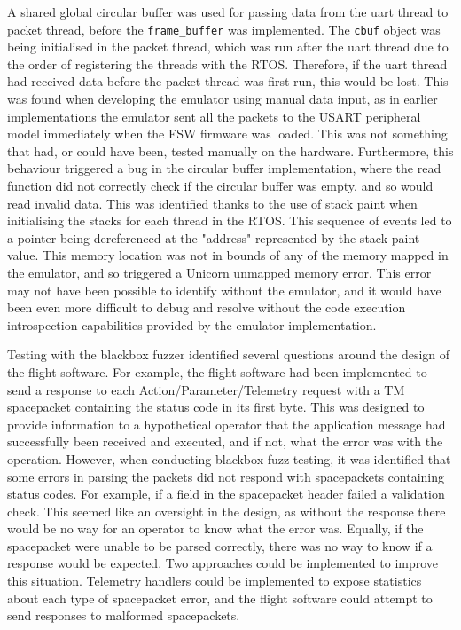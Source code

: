 \documentclass[../report.tex]{subfiles}
\begin{document}
A shared global circular buffer was used for passing data from the uart thread
to packet thread, before the \lstinline|frame_buffer| was implemented. The
\lstinline|cbuf| object was being initialised in the packet thread, which was
run after the uart thread due to the order of registering the threads with the
RTOS. Therefore, if the uart thread had received data before the packet thread
was first run, this would be lost. This was found when developing the emulator
using manual data input, as in earlier implementations the emulator sent all
the packets to the USART peripheral model immediately when the FSW firmware
was loaded. This was not something that had, or could have been, tested manually
on the hardware. Furthermore, this behaviour triggered a bug in the circular
buffer implementation, where the read function did not correctly check if the
circular buffer was empty, and so would read invalid data. This was identified
thanks to the use of stack paint when initialising the stacks for each thread
in the RTOS. This sequence of events led to a pointer being dereferenced at the
"address" represented by the stack paint value. This memory location was not in
bounds of any of the memory mapped in the emulator, and so triggered a Unicorn
unmapped memory error. This error may not have been possible to identify
without the emulator, and it would have been even more difficult to debug and
resolve without the code execution introspection capabilities provided by the
emulator implementation.

Testing with the blackbox fuzzer identified several questions around the design
of the flight software. For example, the flight software had been implemented
to send a response to each Action/Parameter/Telemetry request with a TM
spacepacket containing the status code in its first byte. This was designed to
provide information to a hypothetical operator that the application message had
successfully been received and executed, and if not, what the error was with
the operation. However, when conducting blackbox fuzz testing, it was
identified that some errors in parsing the packets did not respond with
spacepackets containing status codes. For example, if a field in the
spacepacket header failed a validation check. This seemed like an oversight in
the design, as without the response there would be no way for an operator to
know what the error was. Equally, if the spacepacket were unable to be parsed
correctly, there was no way to know if a response would be expected. Two
approaches could be implemented to improve this situation. Telemetry handlers
could be implemented to expose statistics about each type of spacepacket error,
and the flight software could attempt to send responses to malformed spacepackets.
\end{document}
